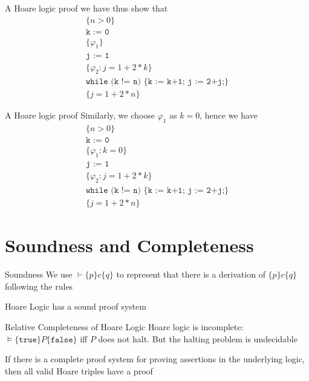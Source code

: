 \documentclass[presentation]{beamer}
\begin{document}
\begin{frame}[label={sec:org4b7a5d0}]{A Hoare logic proof}
we have thus show that
\begin{gather*}
\{n>0\}\\
\texttt{k := 0}\\
\{\varphi_1\}\\
\texttt{j := 1}\\
\{\varphi_2:j=1+2*k\}\\
\texttt{while (k != n) \{k := k+1; j := 2+j;\}}\\
\{j=1+2*n\}
\end{gather*}
\end{frame}
\begin{frame}[label={sec:orgd71bf6f}]{A Hoare logic proof}
Similarly, we choose \(\varphi_1\) as \(k=0\), hence we have
\begin{gather*}
\{n>0\}\\
\texttt{k := 0}\\
\{\varphi_1:k=0\}\\
\texttt{j := 1}\\
\{\varphi_2:j=1+2*k\}\\
\texttt{while (k != n) \{k := k+1; j := 2+j;\}}\\
\{j=1+2*n\}
\end{gather*}
\end{frame}
\section{Soundness and Completeness}
\label{sec:org11ba960}
\begin{frame}[label={sec:orgb5bf044}]{Soundness}
We use \(\vdash\{p\}c\{q\}\) to represent that there is a derivation of \(\{p\}c\{q\}\) following the rules

Hoare Logic has a sound proof system
\end{frame}
\begin{frame}[label={sec:org6b5b256}]{Relative Completeness of Hoare Logic}
Hoare logic is incomplete: \(\vDash\{\texttt{true}\}P\{\texttt{false}\}\) iff \(P\) does not halt. But
the halting problem is undecidable


\begin{theorem}[Cook, 1974]
If there is a complete proof system for proving assertions in the underlying logic, then all
valid Hoare triples have a proof
\end{theorem}
\end{frame}
\end{document}
